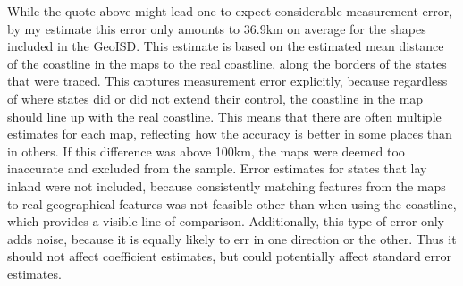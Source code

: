 \documentclass[12pt]{article}
\begin{document}
While the quote above might lead one to expect considerable measurement error,
by my estimate this error only amounts to 36.9km on average for the shapes
included in the GeoISD. This estimate is based on the estimated mean distance of
the coastline in the maps to the real coastline, along the borders of the states
that were traced. This captures measurement error explicitly, because regardless
of where states did or did not extend their control, the coastline in the map
should line up with the real coastline. This means that there are often multiple
estimates for each map, reflecting how the accuracy is better in some places
than in others. If this difference was above 100km, the maps were deemed too
inaccurate and excluded from the sample. Error estimates for states that lay
inland were not included, because consistently matching features from the maps
to real geographical features was not feasible other than when using the
coastline, which provides a visible line of comparison. Additionally, this type
of error only adds noise, because it is equally likely to err in one direction
or the other. Thus it should not affect coefficient estimates, but could
potentially affect standard error estimates.
\end{document}
